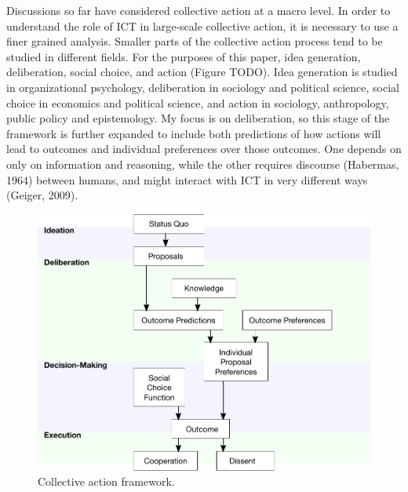 Discussions so far have considered collective action at a macro level. In order to understand the role of ICT in large-scale collective action, it is necessary to use a finer grained analysis. Smaller parts of the collective action process tend to be studied in different fields. For the purposes of this paper, idea generation, deliberation, social choice, and action (Figure TODO). Idea generation is studied in organizational psychology, deliberation in sociology and political science, social choice in economics and political science, and action in sociology, anthropology, public policy and epistemology. My focus is on deliberation, so this stage of the framework is further expanded to include both predictions of how actions will lead to outcomes and individual preferences over those outcomes. One depends  on only on information and reasoning, while the other requires discourse (Habermas, 1964) between humans, and might interact with ICT in very different ways (Geiger, 2009).

\begin{figure}
\centering
\includegraphics[width=4.75in]{images/fig-framework.pdf}
\caption{
Collective action framework.\label{fig:framework}
}
\end{figure}

